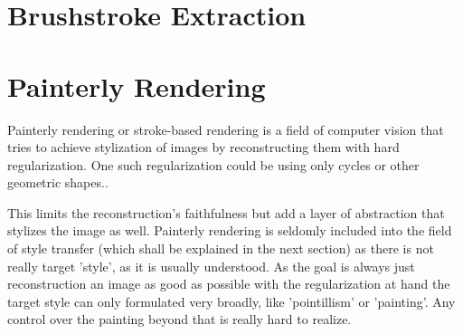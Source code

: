 








\section{Brushstroke Extraction}


\section{Painterly Rendering}


Painterly rendering or stroke-based rendering is a field of computer vision that tries to achieve stylization of images by reconstructing them with hard regularization. 
One such regularization could be using only cycles or other geometric shapes..

This limits the reconstruction's faithfulness but add a layer of abstraction that stylizes the image as well.
Painterly rendering is seldomly included into the field of style transfer (which shall be explained in the next section) as there is not really target 'style', as it is usually understood.
As the goal is always just reconstruction an image as good as possible with the regularization at hand the target style can only formulated very broadly, like 'pointillism' or 'painting'.
Any control over the painting beyond that is really hard to realize.

